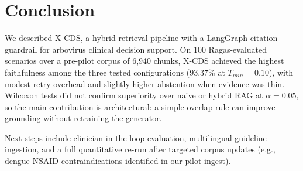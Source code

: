 \section{Conclusion}\label{sec:conclusion}

We described X-CDS, a hybrid retrieval pipeline with a LangGraph citation guardrail for arbovirus clinical decision support. On 100 Ragas-evaluated scenarios over a pre-pilot corpus of 6,940 chunks, X-CDS achieved the highest faithfulness among the three tested configurations (93.37\% at $T_{min}=0.10$), with modest retry overhead and slightly higher abstention when evidence was thin. Wilcoxon tests did not confirm superiority over naive or hybrid RAG at $\alpha=0.05$, so the main contribution is architectural: a simple overlap rule can improve grounding without retraining the generator.

Next steps include clinician-in-the-loop evaluation, multilingual guideline ingestion, and a full quantitative re-run after targeted corpus updates (e.g., dengue NSAID contraindications identified in our pilot ingest).
